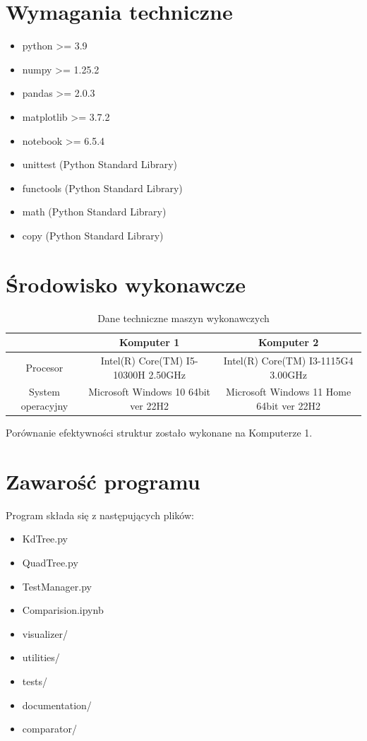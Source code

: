 \documentclass{lab}
\begin{document}
\section{Wymagania techniczne}
\begin{itemize}
    \item python >= 3.9
    \item numpy >= 1.25.2
    \item pandas >= 2.0.3
    \item matplotlib >= 3.7.2
    \item notebook >= 6.5.4
    \item unittest (Python Standard Library)
    \item functools (Python Standard Library)
    \item math (Python Standard Library)
    \item copy (Python Standard Library)
\end{itemize}

\section{Środowisko wykonawcze}
\begin{table}[h]
\centering
\begin{tabular}{|c|c|c|}
\hline
 & Komputer 1 & Komputer 2 \\
\hline
Procesor & Intel(R) Core(TM) I5-10300H 2.50GHz & Intel(R) Core(TM) I3-1115G4 3.00GHz \\
\hline
System operacyjny & Microsoft Windows 10 64bit ver 22H2 & Microsoft Windows 11 Home 64bit ver 22H2 \\
\hline
\end{tabular}
\caption{Dane techniczne maszyn wykonawczych}
\end{table}
Porównanie efektywności struktur zostało wykonane na Komputerze 1.
\section{Zawarość programu}
Program składa się z następujących plików:
\begin{itemize}
    \item KdTree.py
    \item QuadTree.py
    \item TestManager.py
    \item Comparision.ipynb
    \item visualizer/
    \item utilities/
    \item tests/
    \item documentation/
    \item comparator/
\end{itemize}
\end{document}
